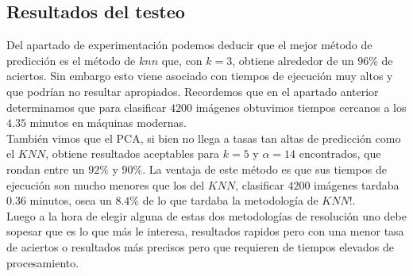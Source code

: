\subsection{Resultados del testeo}
Del apartado de experimentación podemos deducir que el mejor método de predicción es el método de $knn$ que, con $k=3$, obtiene alrededor de un $96 \%$ de aciertos. Sin embargo esto viene asociado con tiempos de ejecución muy altos y que podrían no resultar apropiados. Recordemos que en el apartado anterior determinamos que para clasificar $4200$ imágenes obtuvimos tiempos cercanos a los $4.35$ minutos en máquinas modernas.
\\
También vimos que el PCA, si bien no llega a tasas tan altas de predicción como el $KNN$, obtiene resultados aceptables para $k = 5$ y $\alpha = 14$ encontrados, que rondan entre un $92 \%$ y $90 \%$. La ventaja de este método es que sus tiempos de ejecución son mucho menores que los del $KNN$, clasificar $4200$ imágenes tardaba $0.36$ minutos, osea un $8.4 \%$ de lo que tardaba la metodología de $KNN$!. 
\\
Luego a la hora de elegir alguna de estas dos metodologías de resolución uno debe sopesar que es lo que más le interesa, resultados rapidos pero con una menor tasa de aciertos o resultados más precisos pero que requieren de tiempos elevados de procesamiento.
